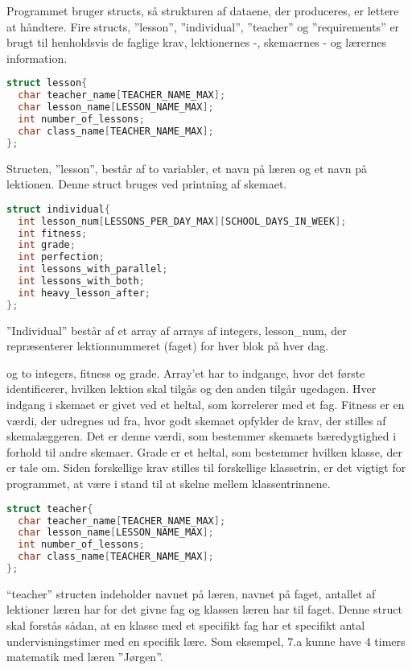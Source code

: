 Programmet bruger structs, så strukturen af dataene, der produceres, er lettere at håndtere. Fire structs, ”lesson”, ”individual”, ”teacher” og ”requirements” er brugt til henholdsvis de faglige krav, lektionernes -, skemaernes - og lærernes information.
\begin{lstlisting}[language = C]
struct lesson{
  char teacher_name[TEACHER_NAME_MAX];
  char lesson_name[LESSON_NAME_MAX];
  int number_of_lessons;
  char class_name[TEACHER_NAME_MAX];
};
\end{lstlisting}

Structen, ”lesson”, består af to variabler, et navn på læren og et navn på lektionen. Denne struct bruges ved printning af skemaet. %

\begin{lstlisting}[language = C]
struct individual{
  int lesson_num[LESSONS_PER_DAY_MAX][SCHOOL_DAYS_IN_WEEK];
  int fitness;
  int grade;
  int perfection;
  int lessons_with_parallel;
  int lessons_with_both;
  int heavy_lesson_after;
};
\end{lstlisting}

”Individual” består af et array af arrays af integers, lesson\_num, der repræsenterer lektionnummeret (faget) for hver blok på hver dag.


 og to integers, fitness og grade. Array’et har to indgange, hvor det første identificerer, hvilken lektion skal tilgås og den anden tilgår ugedagen. Hver indgang i skemaet er givet ved et heltal, som korrelerer med et fag. Fitness er en værdi, der udregnes ud fra, hvor godt skemaet opfylder de krav, der stilles af skemalæggeren. Det er denne værdi, som bestemmer skemaets bæredygtighed i forhold til andre skemaer. Grade er et heltal, som bestemmer hvilken klasse, der er tale om. Siden forskellige krav stilles til forskellige klassetrin, er det vigtigt for programmet, at være i stand til at skelne mellem klassentrinnene.

\begin{lstlisting}[language = C]
struct teacher{
  char teacher_name[TEACHER_NAME_MAX];
  char lesson_name[LESSON_NAME_MAX];
  int number_of_lessons;
  char class_name[TEACHER_NAME_MAX];
};
\end{lstlisting}

“teacher” structen indeholder navnet på læren, navnet på faget, antallet af lektioner læren har for det givne fag og klassen læren har til faget. Denne struct skal forstås sådan, at en klasse med et specifikt fag har et specifikt antal undervisningstimer med en specifik lære. Som eksempel, 7.a kunne have 4 timers matematik med læren ”Jørgen”. 

